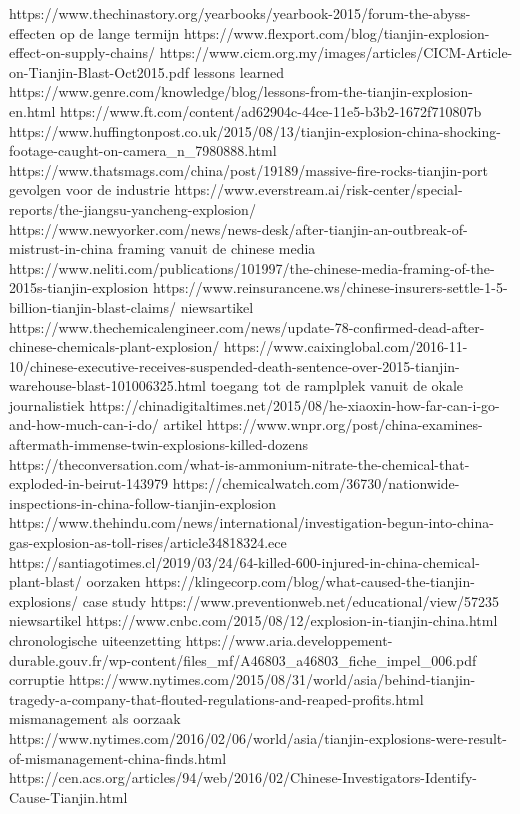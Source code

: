 https://www.thechinastory.org/yearbooks/yearbook-2015/forum-the-abyss-%
effecten op de lange termijn
https://www.flexport.com/blog/tianjin-explosion-effect-on-supply-chains/
https://www.cicm.org.my/images/articles/CICM-Article-on-Tianjin-Blast-Oct2015.pdf
lessons learned
https://www.genre.com/knowledge/blog/lessons-from-the-tianjin-explosion-en.html
https://www.ft.com/content/ad62904c-44ce-11e5-b3b2-1672f710807b
https://www.huffingtonpost.co.uk/2015/08/13/tianjin-explosion-china-shocking-footage-caught-on-camera_n_7980888.html
https://www.thatsmags.com/china/post/19189/massive-fire-rocks-tianjin-port
gevolgen voor de industrie
https://www.everstream.ai/risk-center/special-reports/the-jiangsu-yancheng-explosion/
https://www.newyorker.com/news/news-desk/after-tianjin-an-outbreak-of-mistrust-in-china
framing vanuit de chinese media
https://www.neliti.com/publications/101997/the-chinese-media-framing-of-the-2015s-tianjin-explosion
https://www.reinsurancene.ws/chinese-insurers-settle-1-5-billion-tianjin-blast-claims/
niewsartikel
https://www.thechemicalengineer.com/news/update-78-confirmed-dead-after-chinese-chemicals-plant-explosion/
https://www.caixinglobal.com/2016-11-10/chinese-executive-receives-suspended-death-sentence-over-2015-tianjin-warehouse-blast-101006325.html
toegang tot de ramplplek vanuit de okale journalistiek
https://chinadigitaltimes.net/2015/08/he-xiaoxin-how-far-can-i-go-and-how-much-can-i-do/
artikel
https://www.wnpr.org/post/china-examines-aftermath-immense-twin-explosions-killed-dozens
https://theconversation.com/what-is-ammonium-nitrate-the-chemical-that-exploded-in-beirut-143979
https://chemicalwatch.com/36730/nationwide-inspections-in-china-follow-tianjin-explosion
https://www.thehindu.com/news/international/investigation-begun-into-china-gas-explosion-as-toll-rises/article34818324.ece
https://santiagotimes.cl/2019/03/24/64-killed-600-injured-in-china-chemical-plant-blast/
oorzaken
https://klingecorp.com/blog/what-caused-the-tianjin-explosions/
case study
https://www.preventionweb.net/educational/view/57235
niewsartikel
https://www.cnbc.com/2015/08/12/explosion-in-tianjin-china.html
chronologische uiteenzetting
https://www.aria.developpement-durable.gouv.fr/wp-content/files_mf/A46803_a46803_fiche_impel_006.pdf
corruptie
https://www.nytimes.com/2015/08/31/world/asia/behind-tianjin-tragedy-a-company-that-flouted-regulations-and-reaped-profits.html
mismanagement als oorzaak
https://www.nytimes.com/2016/02/06/world/asia/tianjin-explosions-were-result-of-mismanagement-china-finds.html
https://cen.acs.org/articles/94/web/2016/02/Chinese-Investigators-Identify-Cause-Tianjin.html
